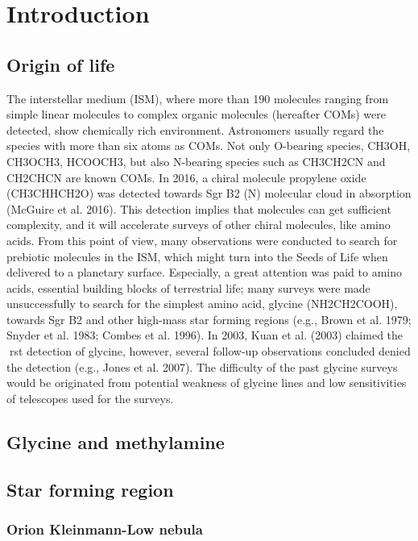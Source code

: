 \chapter{Introduction
  \label{chap:introduction}}


\section{Origin of life}
The interstellar medium (ISM), where more than 190 molecules ranging from simple
linear molecules to complex organic molecules (hereafter COMs) were detected, show
chemically rich environment. Astronomers usually regard the species with more than six
atoms as COMs. Not only O-bearing species, CH3OH, CH3OCH3, HCOOCH3, but also
N-bearing species such as CH3CH2CN and CH2CHCN are known COMs. In 2016, a chiral
molecule propylene oxide (CH3CHHCH2O) was detected towards Sgr B2 (N) molecular
cloud in absorption (McGuire et al. 2016). This detection implies that molecules can get
sufficient complexity, and it will accelerate surveys of other chiral molecules, like amino
acids.
From this point of view, many observations were conducted to search for prebiotic
molecules in the ISM, which might turn into the Seeds of Life when delivered to a
planetary surface. Especially, a great attention was paid to amino acids, essential building
blocks of terrestrial life; many surveys were made unsuccessfully to search for the simplest
amino acid, glycine (NH2CH2COOH), towards Sgr B2 and other high-mass star forming
regions (e.g., Brown et al. 1979; Snyder et al. 1983; Combes et al. 1996). In 2003, Kuan
et al. (2003) claimed the rst detection of glycine, however, several follow-up observations
concluded denied the detection (e.g., Jones et al. 2007). The difficulty of the past glycine
surveys would be originated from potential weakness of glycine lines and low sensitivities of
telescopes used for the surveys.

\section{Glycine and methylamine}


\section{Star forming region}
\subsection{Orion Kleinmann-Low nebula}
